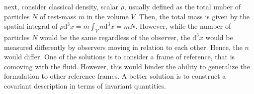 next, consider classical density, scalar $\rho$, usually defined as the 
total umber of particles $N$ of rest-mass $m$ in the volume $V$. 
Then, the total mass is given by the 
spatial integral of $\rho \text{d}^3x = m\int_V n \text{d}^3 x = mN$. 
However, while the number of particles $N$ would be the same regardless of the observer, 
the $\text{d}^3x$ would be measured differently by observers moving in relation to each other. 
Hence, the $n$ would differ. 
One of the solutions is to consider a frame of reference, that is comoving with the fluid.
However, this would hinder the ability to generalize the formulation to other reference frames.
A better solution is to construct a covariant description in terms of invariant quantities.
%
%
%
